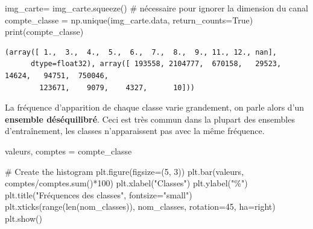 \documentclass[
  11pt,
  letterpaper,
  open=any,
  twoside=false,
  french]{scrbook}
\newenvironment{Shaded}{\begin{snugshade}}{\end{snugshade}}
\newcommand{\BuiltInTok}[1]{\textcolor[rgb]{0.00,0.23,0.31}{#1}}
\newcommand{\CommentTok}[1]{\textcolor[rgb]{0.37,0.37,0.37}{#1}}
\newcommand{\DecValTok}[1]{\textcolor[rgb]{0.68,0.00,0.00}{#1}}
\newcommand{\NormalTok}[1]{\textcolor[rgb]{0.00,0.23,0.31}{#1}}
\newcommand{\OperatorTok}[1]{\textcolor[rgb]{0.37,0.37,0.37}{#1}}
\newcommand{\StringTok}[1]{\textcolor[rgb]{0.13,0.47,0.30}{#1}}
\newcommand{\VariableTok}[1]{\textcolor[rgb]{0.07,0.07,0.07}{#1}}
\begin{document}
\begin{Shaded}
\begin{Highlighting}[]
\NormalTok{img\_carte}\OperatorTok{=}\NormalTok{ img\_carte.squeeze() }\CommentTok{\# nécessaire pour ignorer la dimension du canal}
\NormalTok{compte\_classe }\OperatorTok{=}\NormalTok{ np.unique(img\_carte.data, return\_counts}\OperatorTok{=}\VariableTok{True}\NormalTok{)}
\BuiltInTok{print}\NormalTok{(compte\_classe)}
\end{Highlighting}
\end{Shaded}

\begin{verbatim}
(array([ 1.,  3.,  4.,  5.,  6.,  7.,  8.,  9., 11., 12., nan],
      dtype=float32), array([ 193558, 2104777,  670158,   29523,   14624,   94751,  750046,
        123671,    9079,    4327,      10]))
\end{verbatim}

La fréquence d'apparition de chaque classe varie grandement, on parle
alors d'un \textbf{ensemble déséquilibré}. Ceci est très commun dans la
plupart des ensembles d'entraînement, les classes n'apparaissent pas
avec la même fréquence.

\begin{Shaded}
\begin{Highlighting}[]
\NormalTok{valeurs, comptes }\OperatorTok{=}\NormalTok{ compte\_classe}

\CommentTok{\# Create the histogram}
\NormalTok{plt.figure(figsize}\OperatorTok{=}\NormalTok{(}\DecValTok{5}\NormalTok{, }\DecValTok{3}\NormalTok{))}
\NormalTok{plt.bar(valeurs, comptes}\OperatorTok{/}\NormalTok{comptes.}\BuiltInTok{sum}\NormalTok{()}\OperatorTok{*}\DecValTok{100}\NormalTok{)}
\NormalTok{plt.xlabel(}\StringTok{"Classes"}\NormalTok{)}
\NormalTok{plt.ylabel(}\StringTok{"\%"}\NormalTok{)}
\NormalTok{plt.title(}\StringTok{"Fréquences des classes"}\NormalTok{, fontsize}\OperatorTok{=}\StringTok{"small"}\NormalTok{)}
\NormalTok{plt.xticks(}\BuiltInTok{range}\NormalTok{(}\BuiltInTok{len}\NormalTok{(nom\_classes)), nom\_classes, rotation}\OperatorTok{=}\DecValTok{45}\NormalTok{, ha}\OperatorTok{=}\StringTok{\textquotesingle{}right\textquotesingle{}}\NormalTok{)}
\NormalTok{plt.show()}
\end{Highlighting}
\end{Shaded}
\end{document}

